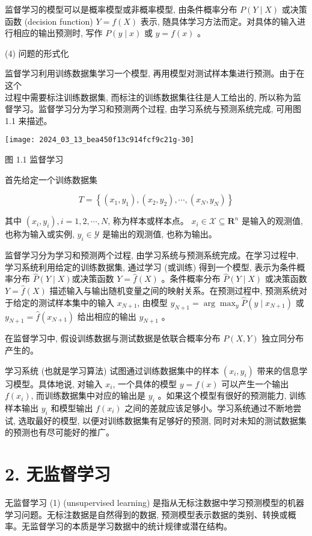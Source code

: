\documentclass[10pt]{article}
\begin{document}
\begin{CJK*}{UTF8}{bsmi}
监督学习的模型可以是概率模型或非概率模型, 由条件概率分布 $P(Y \mid X)$ 或决策函数 (decision function) $Y=f(X)$ 表示, 随具体学习方法而定。对具体的输入进行相应的输出预测时, 写作 $P(y \mid x)$ 或 $y=f(x)$ 。

(4) 问题的形式化

监督学习利用训练数据集学习一个模型, 再用模型对测试样本集进行预测。由于在这个\\
过程中需要标注训练数据集, 而标注的训练数据集往往是人工给出的, 所以称为监督学习。监督学习分为学习和预测两个过程, 由学习系统与预测系统完成, 可用图 1.1 来描述。

\begin{center}
\texttt{[image: 2024\_03\_13\_bea450f13c914fcf9c21g-30]}
\end{center}

图 1.1 监督学习

首先给定一个训练数据集

$$
T=\left\{\left(x_{1}, y_{1}\right),\left(x_{2}, y_{2}\right), \cdots,\left(x_{N}, y_{N}\right)\right\}
$$

其中 $\left(x_{i}, y_{i}\right), i=1,2, \cdots, N$, 称为样本或样本点。 $x_{i} \in \mathcal{X} \subseteq \boldsymbol{R}^{n}$ 是输入的观测值, 也称为输入或实例, $y_{i} \in \mathcal{Y}$ 是输出的观测值, 也称为输出。

监督学习分为学习和预测两个过程, 由学习系统与预测系统完成。在学习过程中, 学习系统利用给定的训练数据集, 通过学习 (或训练) 得到一个模型, 表示为条件概率分布 $\hat{P}(Y \mid X)$或决策函数 $Y=\hat{f}(X)$ 。条件概率分布 $\hat{P}(Y \mid X)$ 或决策函数 $Y=\hat{f}(X)$ 描述输入与输出随机变量之间的映射关系。在预测过程中, 预测系统对于给定的测试样本集中的输入 $x_{N+1}$, 由模型 $y_{N+1}=\arg \max _{y} \hat{P}\left(y \mid x_{N+1}\right)$ 或 $y_{N+1}=\hat{f}\left(x_{N+1}\right)$ 给出相应的输出 $y_{N+1}$ 。

在监督学习中, 假设训练数据与测试数据是依联合概率分布 $P(X, Y)$ 独立同分布产生的。

学习系统 (也就是学习算法) 试图通过训练数据集中的样本 $\left(x_{i}, y_{i}\right)$ 带来的信息学习模型。具体地说, 对输入 $x_{i}$, 一个具体的模型 $y=f(x)$ 可以产生一个输出 $f\left(x_{i}\right)$, 而训练数据集中对应的输出是 $y_{i}$ 。如果这个模型有很好的预测能力, 训练样本输出 $y_{i}$ 和模型输出 $f\left(x_{i}\right)$ 之间的差就应该足够小。学习系统通过不断地尝试, 选取最好的模型, 以便对训练数据集有足够好的预测, 同时对未知的测试数据集的预测也有尽可能好的推广。

\section*{2. 无监督学习}
无监督学习 (1) (unsupervised learning) 是指从无标注数据中学习预测模型的机器学习问题。无标注数据是自然得到的数据, 预测模型表示数据的类别、转换或概率。无监督学习的本质是学习数据中的统计规律或潜在结构。


\end{CJK*}
\end{document}
